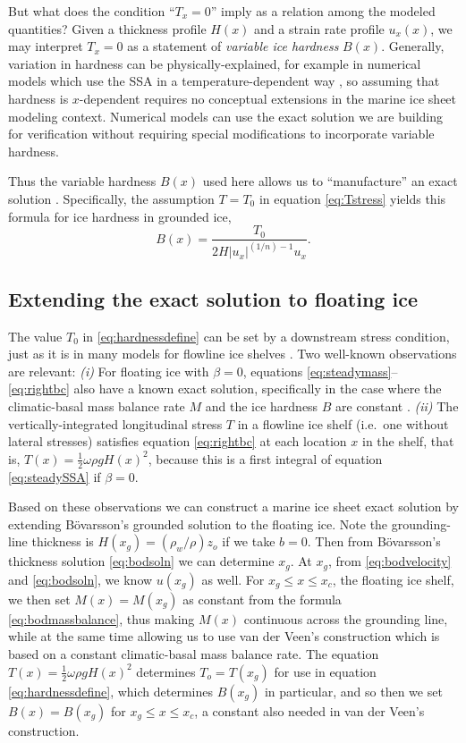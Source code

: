 \documentclass[twocolumn]{igs}
\renewcommand{\dh}{\fontencoding{T1}\selectfont{\symbol{240}}}
\newcommand{\bod}{B\"o\dh varsson\xspace}
\begin{document}
But what does the condition ``$T_x = 0$'' imply as a relation among the modeled quantities?  Given a thickness profile $H(x)$ and a strain rate profile $u_x(x)$, we may interpret $T_x = 0$ as a statement of \emph{variable ice hardness} $B(x)$.  Generally, variation in hardness can be physically-explained, for example in numerical models which use the SSA in a temperature-dependent way \citep{BBssasliding}, so assuming that hardness is $x$-dependent requires no conceptual extensions in the marine ice sheet modeling context.  Numerical models can use the exact solution we are building for verification without requiring special modifications to incorporate variable hardness.

Thus the variable hardness $B(x)$ used here allows us to ``manufacture'' an exact solution \citep{BLKCB}.  Specifically, the assumption $T=T_0$ in equation \eqref{eq:Tstress} yields this formula for ice hardness in grounded ice,
\begin{equation}
B(x) = \frac{T_0}{2 H |u_x|^{(1/n)-1} u_x}. \label{eq:hardnessdefine}
\end{equation}

\subsection*{Extending the exact solution to floating ice}  The value $T_0$ in \eqref{eq:hardnessdefine} can be set by a downstream stress condition, just as it is in many models for flowline ice shelves \citep[e.g.][]{MISMIP2012,SchoofMarine1}.  Two well-known observations are relevant:  \emph{(i)}  For floating ice with $\beta=0$, equations \eqref{eq:steadymass}--\eqref{eq:rightbc} also have a known exact solution, specifically in the case where the climatic-basal mass balance rate $M$ and the ice hardness $B$ are constant \citep{vanderVeen83,vanderVeen}.  \emph{(ii)}  The vertically-integrated longitudinal stress $T$ in a flowline ice shelf (i.e.~one without lateral stresses) satisfies equation \eqref{eq:rightbc} at each location $x$ in the shelf, that is, $T(x) = \frac{1}{2} \omega \rho g H(x)^2$, because this is a first integral of equation \eqref{eq:steadySSA} if $\beta=0$.

Based on these observations we can construct a marine ice sheet exact solution by extending \bod's grounded solution to the floating ice.  Note the grounding-line thickness is $H(x_g) = (\rho_w/\rho) z_o$ if we take $b=0$.  Then from \bod's thickness solution \eqref{eq:bodsoln} we can determine $x_g$.  At $x_g$, from \eqref{eq:bodvelocity} and \eqref{eq:bodsoln}, we know $u(x_g)$ as well.  For $x_g \le x \le x_c$, the floating ice shelf, we then set $M(x) = M(x_g)$ as constant from the formula \eqref{eq:bodmassbalance}, thus making $M(x)$ continuous across the grounding line, while at the same time allowing us to use van der Veen's construction which is based on a constant climatic-basal mass balance rate.  The equation $T(x) = \frac{1}{2} \omega \rho g H(x)^2$ determines $T_o=T(x_g)$ for use in equation \eqref{eq:hardnessdefine}, which determines $B(x_g)$ in particular, and so then we set $B(x)=B(x_g)$ for $x_g \le x \le x_c$, a constant also needed in van der Veen's construction.
\end{document}
